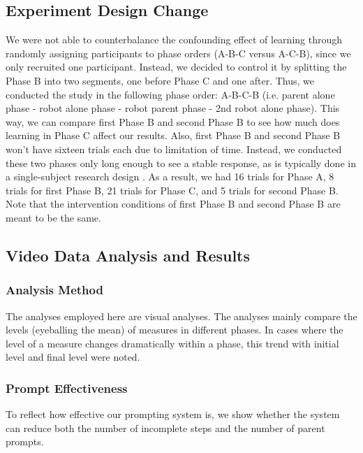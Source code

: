 \subsection{Experiment Design Change}
We were not able to counterbalance the confounding effect of learning through randomly assigning participants to phase orders (A-B-C versus A-C-B), since we only recruited one participant.  Instead, we decided to control it by splitting the Phase B into two segments, one before Phase C and one after.  Thus, we conducted the study in the following phase order: A-B-C-B (i.e. parent alone phase - robot alone phase - robot parent phase - 2nd robot alone phase).  This way, we can compare first Phase B and second Phase B to see how much does learning in Phase C affect our results.  Also, first Phase B and second Phase B won't have sixteen trials each due to limitation of time.  Instead, we conducted these two phases only long enough to see a stable response, as is typically done in a single-subject research design \cite{ayres2009acquisition, bereznak2012video}.  As a result, we had 16 trials for Phase A, 8 trials for first Phase B, 21 trials for Phase C, and 5 trials for second Phase B.  Note that the intervention conditions of first Phase B and second Phase B are meant to be the same.


\subsection{Video Data Analysis and Results}
\label{sec:VideoDataAnalysisAndResults}

\subsubsection{Analysis Method}
The analyses employed here are visual analyses.  The analyses mainly compare the levels (eyeballing the mean) of measures in different phases.  In cases where the level of a measure changes dramatically within a phase, this trend with initial level and final level were noted.

\subsubsection{Prompt Effectiveness}
To reflect how effective our prompting system is, we show whether the system can reduce both the number of incomplete steps and the number of parent prompts.


